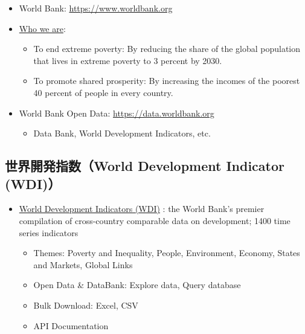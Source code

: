 \documentclass[
  xelatex, ja=standard]{bxjsbook}
\providecommand{\tightlist}{%
  \setlength{\itemsep}{0pt}\setlength{\parskip}{0pt}}
\theoremstyle{definition}
\theoremstyle{definition}
\theoremstyle{definition}
\theoremstyle{definition}
\theoremstyle{remark}
\begin{document}
\begin{itemize}
\tightlist
\item
  World Bank: \url{https://www.worldbank.org}
\item
  \href{https://www.worldbank.org/en/who-we-are}{Who we are}:

  \begin{itemize}
  \tightlist
  \item
    To end extreme poverty: By reducing the share of the global population that lives in extreme poverty to 3 percent by 2030.
  \item
    To promote shared prosperity: By increasing the incomes of the poorest 40 percent of people in every country.
  \end{itemize}
\item
  World Bank Open Data: \url{https://data.worldbank.org}

  \begin{itemize}
  \tightlist
  \item
    Data Bank, World Development Indicators, etc.
  \end{itemize}
\end{itemize}

\hypertarget{ux4e16ux754cux958bux767aux6307ux6570world-development-indicator-wdi}{%
\subsection{世界開発指数（World Development Indicator (WDI)）}\label{ux4e16ux754cux958bux767aux6307ux6570world-development-indicator-wdi}}

\begin{itemize}
\tightlist
\item
  \href{https://datatopics.worldbank.org/world-development-indicators/}{World Development Indicators (WDI)} : the World Bank's premier compilation of cross-country comparable data on development; 1400 time series indicators

  \begin{itemize}
  \tightlist
  \item
    Themes: Poverty and Inequality, People, Environment, Economy, States and Markets, Global Links
  \item
    Open Data \& DataBank: Explore data, Query database
  \item
    Bulk Download: Excel, CSV
  \item
    API Documentation
  \end{itemize}
\end{itemize}
\end{document}
